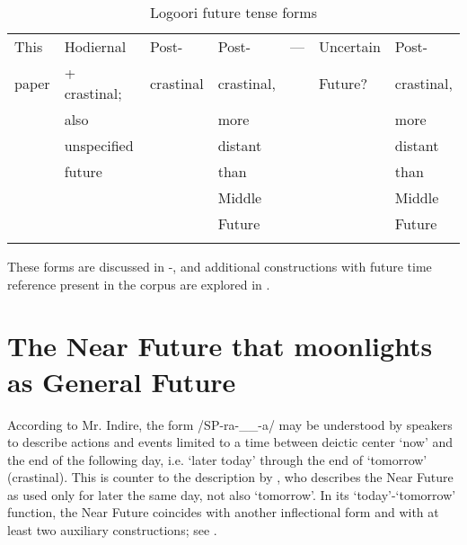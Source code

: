 \documentclass[output=paper]{langsci/langscibook}
\begin{document}
\begin{table}
\begin{tabular}{lllllll}
\footnotesize This & \footnotesize Hodiernal & \footnotesize Post- & \footnotesize Post- & \footnotesize — & \footnotesize Uncertain & \footnotesize Post- \\
\footnotesize paper & \footnotesize + crastinal; & \footnotesize crastinal & \footnotesize crastinal, & & \footnotesize Future? & \footnotesize crastinal, \\
& \footnotesize also & & \footnotesize more & & & \footnotesize more \\
& \footnotesize unspecified & & \footnotesize distant & & & \footnotesize distant \\
& \footnotesize future & & \footnotesize than & & & \footnotesize than \\
& & & \footnotesize Middle & & & \footnotesize Middle \\
& & & \footnotesize Future & & & \footnotesize Future \\
\lspbottomrule
\end{tabular}
\caption{Logoori future tense forms}
\label{tab:sarvasy:1}
\end{table}

These forms are discussed in -, and additional constructions with future time reference present in the corpus are explored in .

\section{The Near Future that moonlights as General Future} \label{sec:sarvasy:3}

According to Mr. Indire, the form /SP-ra-\_\_-a/ may be understood by speakers to describe actions and events limited to a time between deictic center ‘now’ and the end of the following day, i.e. ‘later today’ through the end of ‘tomorrow’ (crastinal). This is counter to the description by \citet[174]{Leung1991}, who describes the Near Future as used only for later the same day, not also ‘tomorrow’. In its ‘today’-‘tomorrow’ function, the Near Future coincides with another inflectional form and with at least two auxiliary constructions; see .
\end{document}

